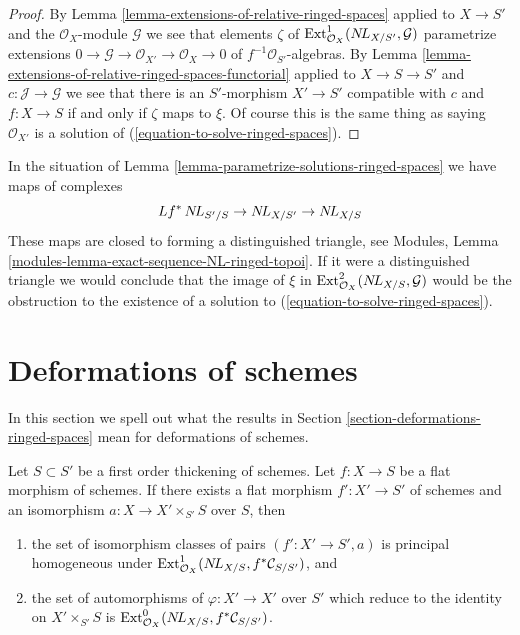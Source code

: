 \begin{proof}
By Lemma \ref{lemma-extensions-of-relative-ringed-spaces}
applied to $X \to S'$ and the $\mathcal{O}_X$-module $\mathcal{G}$
we see that elements $\zeta$ of
$\mathop{\mathrm{Ext}}\nolimits^1_{\mathcal{O}_X}(\mathop{N\!L}\nolimits_{X/S'}, \mathcal{G})$
parametrize extensions
$0 \to \mathcal{G} \to \mathcal{O}_{X'} \to \mathcal{O}_X \to 0$
of $f^{-1}\mathcal{O}_{S'}$-algebras. By
Lemma \ref{lemma-extensions-of-relative-ringed-spaces-functorial} applied
to $X \to S \to S'$ and $c : \mathcal{J} \to \mathcal{G}$
we see that there is an $S'$-morphism
$X' \to S'$ compatible with $c$ and $f : X \to S$ if and only if
$\zeta$ maps to $\xi$. Of course this is the same thing as saying
$\mathcal{O}_{X'}$ is a
solution of (\ref{equation-to-solve-ringed-spaces}).
\end{proof}

\begin{remark}
\label{remark-parametrize-solutions-ringed-spaces}
In the situation of
Lemma \ref{lemma-parametrize-solutions-ringed-spaces}
we have maps of complexes
$$
Lf^*\mathop{N\!L}\nolimits_{S'/S} \to \mathop{N\!L}\nolimits_{X/S'} \to \mathop{N\!L}\nolimits_{X/S}
$$
These maps are closed to forming a distinguished triangle, see
Modules, Lemma \ref{modules-lemma-exact-sequence-NL-ringed-topoi}.
If it were a distinguished triangle we would conclude
that the image of $\xi$ in $\mathop{\mathrm{Ext}}\nolimits^2_{\mathcal{O}_X}(\mathop{N\!L}\nolimits_{X/S}, \mathcal{G})$
would be the obstruction to the existence of a solution to
(\ref{equation-to-solve-ringed-spaces}).
\end{remark}













\section{Deformations of schemes}
\label{section-deformations-schemes}

\noindent
In this section we spell out what the results in
Section \ref{section-deformations-ringed-spaces}
mean for deformations of schemes.

\begin{lemma}
\label{lemma-deform}
Let $S \subset S'$ be a first order thickening of schemes.
Let $f : X \to S$ be a flat morphism of schemes.
If there exists a flat morphism $f' : X' \to S'$ of schemes
and an isomorphism $a : X \to X' \times_{S'} S$ over $S$, then
\begin{enumerate}
\item the set of isomorphism classes of pairs $(f' : X' \to S', a)$ is
principal homogeneous under
$\mathop{\mathrm{Ext}}\nolimits^1_{\mathcal{O}_X}(\mathop{N\!L}\nolimits_{X/S}, f^*\mathcal{C}_{S/S'})$, and
\item the set of automorphisms of $\varphi : X' \to X'$
over $S'$ which reduce to the identity on $X' \times_{S'} S$
is $\mathop{\mathrm{Ext}}\nolimits^0_{\mathcal{O}_X}(\mathop{N\!L}\nolimits_{X/S}, f^*\mathcal{C}_{S/S'})$.
\end{enumerate}
\end{lemma}

